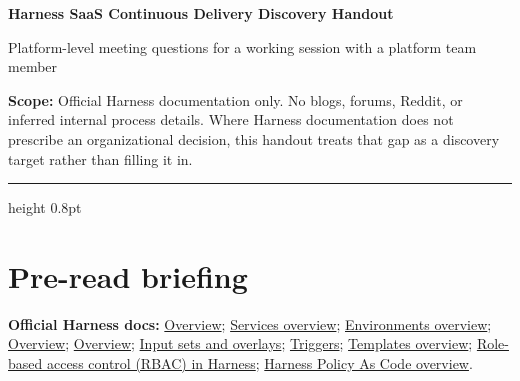 \documentclass[11pt]{article}
\newcommand{\doccluster}[1]{%
  {\small\textcolor{AccentGray}{\textbf{Official Harness docs:} #1}}\par\vspace{0.4em}
}
\begin{document}
{\LARGE\bfseries Harness SaaS Continuous Delivery Discovery Handout}\par
\vspace{0.25em}
{\large Platform-level meeting questions for a working session with a platform team member}\par
\vspace{0.5em}
\textbf{Scope:} Official Harness documentation only. No blogs, forums, Reddit, or inferred internal process details. Where Harness documentation does not prescribe an organizational decision, this handout treats that gap as a discovery target rather than filling it in.\par
\vspace{0.6em}
\hrule height 0.8pt
\vspace{0.7em}

\section*{Pre-read briefing}
\doccluster{\href{https://developer.harness.io/docs/continuous-delivery/overview}{Overview}; \href{https://developer.harness.io/docs/continuous-delivery/x-platform-cd-features/services/services-overview}{Services overview}; \href{https://developer.harness.io/docs/continuous-delivery/x-platform-cd-features/environments/environment-overview}{Environments overview}; \href{https://developer.harness.io/docs/platform/delegates/delegate-concepts/delegate-overview/}{Overview}; \href{https://developer.harness.io/docs/platform/get-started/overview/}{Overview}; \href{https://developer.harness.io/docs/platform/pipelines/input-sets}{Input sets and overlays}; \href{https://developer.harness.io/docs/category/triggers/}{Triggers}; \href{https://developer.harness.io/docs/platform/templates/template}{Templates overview}; \href{https://developer.harness.io/docs/platform/role-based-access-control/rbac-in-harness/}{Role-based access control (RBAC) in Harness}; \href{https://developer.harness.io/docs/platform/governance/policy-as-code/harness-governance-overview}{Harness Policy As Code overview}.}
\end{document}
